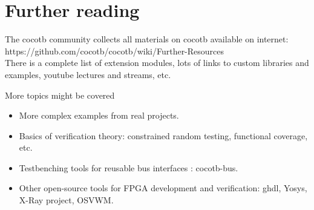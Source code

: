 \documentclass[aspectratio=169]{beamer}
\begin{document}
\section*{Further reading}
\begin{frame}[fragile]{\secname}
  The cocotb community collects all materials on cocotb available on internet: 
  {\color{blue} https://github.com/cocotb/cocotb/wiki/Further-Resources} \\
  There is a complete list of extension modules, lots of links to custom libraries and examples, youtube lectures and streams, etc. 

   \begin{exampleblock}{More topics might be covered}
     \begin{itemize}
      \item More complex examples from real projects. 
      \item Basics of verification theory: constrained random testing, functional coverage, etc. 
      \item Testbenching tools for reusable bus interfaces : cocotb-bus. 
      \item Other open-source tools for FPGA development and verification: ghdl, Yosys, X-Ray project, OSVWM.
     \end{itemize}
     
   \end{exampleblock}
    
\end{frame}
\end{document}
